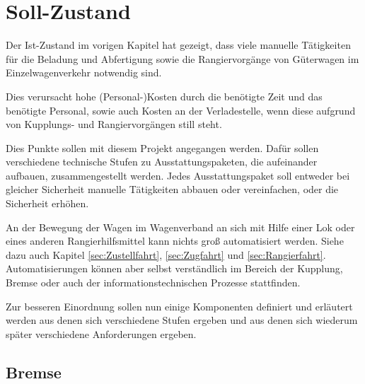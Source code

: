 \section{Soll-Zustand}
Der Ist-Zustand im vorigen Kapitel hat gezeigt, dass viele manuelle Tätigkeiten für die Beladung und Abfertigung sowie die Rangiervorgänge von Güterwagen im Einzelwagenverkehr notwendig sind.\par
Dies verursacht hohe (Personal-)Kosten durch die benötigte Zeit und das benötigte Personal, sowie auch Kosten an der Verladestelle, wenn diese aufgrund von Kupplungs- und Rangiervorgängen still steht.\par
Dies Punkte sollen mit diesem Projekt angegangen werden. Dafür sollen verschiedene technische Stufen zu Ausstattungspaketen, die aufeinander aufbauen, zusammengestellt werden. Jedes Ausstattungspaket soll entweder bei gleicher Sicherheit manuelle Tätigkeiten abbauen oder vereinfachen, oder die Sicherheit erhöhen.\par
An der Bewegung der Wagen im Wagenverband an sich mit Hilfe einer Lok oder eines anderen Rangierhilfsmittel kann nichts groß automatisiert werden. Siehe dazu auch Kapitel \ref{sec:Zustellfahrt}, \ref{sec:Zugfahrt} und \ref{sec:Rangierfahrt}. Automatisierungen können aber selbst verständlich im Bereich der Kupplung, Bremse oder auch der informationstechnischen Prozesse stattfinden.\par
Zur besseren Einordnung sollen nun einige Komponenten definiert und erläutert werden aus denen sich verschiedene Stufen ergeben und aus denen sich wiederum später verschiedene Anforderungen ergeben.

\subsection{Bremse}

